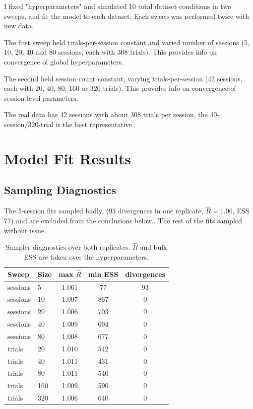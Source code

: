 \documentclass[11pt]{article}
\begin{document}
I fixed "hyperparameters" and simulated 10 total dataset conditions in two sweeps, and fit the model to each dataset. Each sweep was performed twice with new data.

The first sweep held trials-per-session constant and varied number of sessions (5, 10, 20, 40 and 80 sessions, each with 308 trials). This provides info on convergence of global hyperparameters.

The second held session count constant, varying trials-per-session (42 sessions, each with 20, 40, 80, 160 or 320 trials). This provides info on convergence of session-level parameters.

The real data has 42 sessions with about 308 trials per session, the 40-session/320-trial is the best representative.

\section{Model Fit Results}

\subsection{Sampling Diagnostics}
The 5-session fits sampled badly, (93 divergences in one replicate,
$\hat{R}=1.06$, ESS 77) and are excluded from the conclusions below.. The rest of the fits sampled without issue.

\begin{table}[H]
\centering
\caption{Sampler diagnostics over both replicates. $\hat{R}$ and bulk ESS are
taken over the hyperparameters.}
\begin{tabular}{llccc}
\toprule
Sweep & Size & max $\hat{R}$ & min ESS & divergences \\
\midrule
sessions & 5   & 1.061 & 77  & 93 \\
sessions & 10  & 1.007 & 867 & 0 \\
sessions & 20  & 1.006 & 703 & 0 \\
sessions & 40  & 1.009 & 694 & 0 \\
sessions & 80  & 1.008 & 677 & 0 \\
\midrule
trials & 20  & 1.010 & 542 & 0 \\
trials & 40  & 1.011 & 431 & 0 \\
trials & 80  & 1.011 & 540 & 0 \\
trials & 160 & 1.009 & 590 & 0 \\
trials & 320 & 1.006 & 640 & 0 \\
\bottomrule
\end{tabular}
\end{table}
\end{document}
